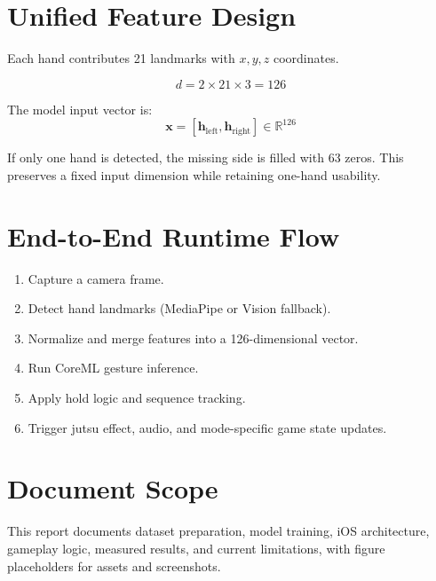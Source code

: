 \section{Unified Feature Design}
Each hand contributes 21 landmarks with \(x,y,z\) coordinates.

\[
d = 2 \times 21 \times 3 = 126
\]

The model input vector is:
\[
\mathbf{x} = [\mathbf{h}_{\text{left}}, \mathbf{h}_{\text{right}}] \in \mathbb{R}^{126}
\]

If only one hand is detected, the missing side is filled with 63 zeros. This preserves a fixed input dimension while retaining one-hand usability.

\section{End-to-End Runtime Flow}
\begin{enumerate}[leftmargin=2em]
\item Capture a camera frame.
\item Detect hand landmarks (MediaPipe or Vision fallback).
\item Normalize and merge features into a 126-dimensional vector.
\item Run CoreML gesture inference.
\item Apply hold logic and sequence tracking.
\item Trigger jutsu effect, audio, and mode-specific game state updates.
\end{enumerate}


\section{Document Scope}
This report documents dataset preparation, model training, iOS architecture, gameplay logic, measured results, and current limitations, with figure placeholders for assets and screenshots.
